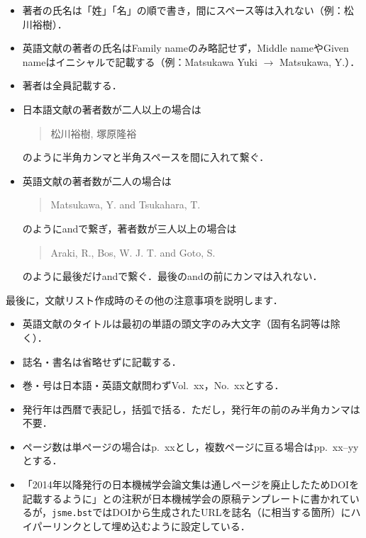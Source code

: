 \documentclass[a4paper,fleqn,uplatex,dvipdfmx]{jsarticle}
\newcommand{\jsmefile}{\texttt{jsme.bst}}
\begin{document}
\begin{itembox}[l]{}
    \begin{itemize}
        \item 著者の氏名は「姓」「名」の順で書き，間にスペース等は入れない（例：松川裕樹）．
        \item 英語文献の著者の氏名はFamily nameのみ略記せず，Middle nameやGiven nameはイニシャルで記載する（例：Matsukawa Yuki $\to$ Matsukawa, Y.）．
        \item 著者は全員記載する．
        \item 日本語文献の著者数が二人以上の場合は
            \begin{quote}
                松川裕樹, 塚原隆裕        
            \end{quote}
            のように半角カンマと半角スペースを間に入れて繋ぐ．
        \item 英語文献の著者数が二人の場合は
            \begin{quote}
                Matsukawa, Y. and Tsukahara, T.        
            \end{quote}
            のようにandで繋ぎ，著者数が三人以上の場合は
            \begin{quote}
                Araki, R., Bos, W. J. T. and Goto, S.            
            \end{quote}
            のように最後だけandで繋ぐ．最後のandの前にカンマは入れない．
    \end{itemize}
\end{itembox}
最後に，文献リスト作成時のその他の注意事項を説明します．
\begin{itembox}[l]{}
    \begin{itemize}
        \item 英語文献のタイトルは最初の単語の頭文字のみ大文字（固有名詞等は除く）．
        \item 誌名・書名は省略せずに記載する．
        \item 巻・号は日本語・英語文献問わずVol.~xx，No.~xxとする．
        \item 発行年は西暦で表記し，括弧で括る．ただし，発行年の前のみ半角カンマは不要．
        \item ページ数は単ページの場合はp.~xxとし，複数ページに亘る場合はpp.~xx--yyとする．
        \item 「2014年以降発行の日本機械学会論文集は通しページを廃止したためDOIを記載するように」との注釈が日本機械学会の原稿テンプレートに書かれているが，\jsmefile ではDOIから生成されたURLを誌名（に相当する箇所）にハイパーリンクとして埋め込むように設定している．
    \end{itemize}
\end{itembox}
\end{document}
